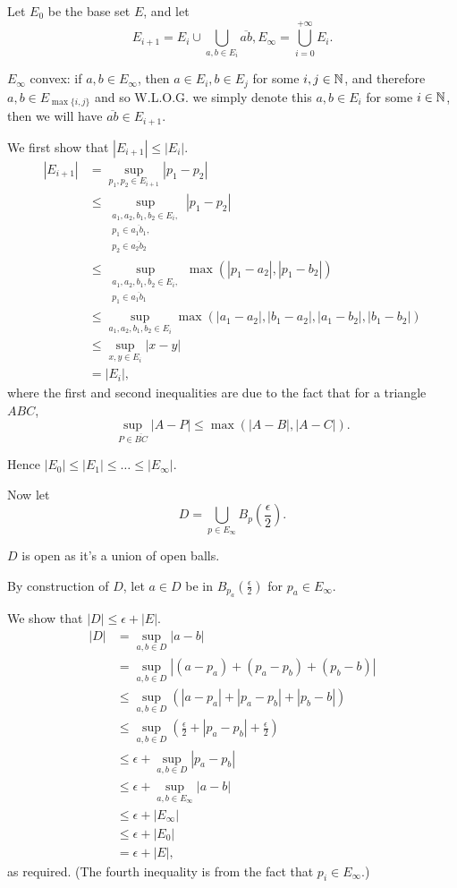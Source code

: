 Let \(E_0\) be the base set \(E\), and let 
\[E_{i+1} = E_i \cup \bigcup_{a, b \in E_i} \overline{ab}, E_\infty = \bigcup_{i=0}^{+\infty} E_i.\]

\(E_\infty\) convex: if \(a, b \in E_\infty\), then \(a \in E_i, b \in E_j\) for some \(i, j \in \mathbb{N}\), and therefore \(a, b \in E_{\max\{i, j\}}\) and so W.L.O.G. we simply denote this \(a, b \in E_i\) for some \(i \in \mathbb{N}\), then we will have \(\overline{ab} \in E_{i+1}\).

We first show that \(|E_{i+1}| \leq |E_i|\).
\begin{align*}
    |E_{i+1}| &= \sup_{p_1, p_2 \in E_{i+1}} |p_1-p_2| \\
    &\leq \sup_{\substack{a_1, a_2, b_1, b_2 \in E_i,\\p_1 \in \overline{a_1b_1},\\p_2 \in \overline{a_2b_2}}} |p_1-p_2| \\
    &\leq \sup_{\substack{a_1, a_2, b_1, b_2 \in E_i, \\ p_1 \in \overline{a_1b_1}}} \max(|p_1-a_2|, |p_1-b_2|) \\
    &\leq \sup_{a_1, a_2, b_1, b_2 \in E_i} \max(|a_1-a_2|, |b_1-a_2|, |a_1-b_2|, |b_1-b_2|) \\
    &\leq \sup_{x, y \in E_i} |x-y| \\
    &= |E_i|,
\end{align*}
where the first and second inequalities are due to the fact that for a triangle \(ABC\),
\[\sup_{P \in \overline{BC}} |A-P| \leq \max(|A-B|, |A-C|).\]

Hence \(|E_0| \leq |E_1| \leq \ldots \leq |E_\infty|\).

Now let
\[D = \bigcup_{p \in E_{\infty}} B_p\left(\frac{\epsilon}{2}\right).\]

\(D\) is open as it's a union of open balls.

By construction of \(D\), let \(a \in D\) be in \(B_{p_a}\left(\frac{\epsilon}{2}\right)\) for \(p_a \in E_\infty\).

We show that \(|D| \leq \epsilon + |E|\).
\begin{align*}
    |D| &= \sup_{a,b \in D} |a-b|\\
    &= \sup_{a,b \in D} |(a-p_a) + (p_a-p_b) + (p_b-b)|\\
    &\leq \sup_{a,b \in D} \left(|a-p_a| + |p_a-p_b| + |p_b-b|\right)\\
    &\leq \sup_{a,b \in D} \left(\frac{\epsilon}{2} + |p_a-p_b| + \frac{\epsilon}{2}\right)\\
    &\leq \epsilon + \sup_{a,b \in D} |p_a-p_b| \\
    &\leq \epsilon + \sup_{a,b \in E_\infty} |a-b| \\
    &\leq  \epsilon + |E_\infty| \\
    &\leq  \epsilon + |E_0| \\
    &=  \epsilon + |E|,
\end{align*}
as required. (The fourth inequality is from the fact that $p_i \in E_{\infty}$.)

